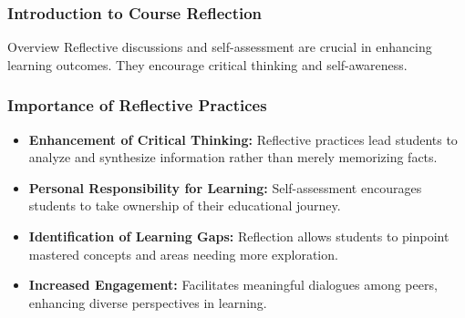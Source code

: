 \documentclass[aspectratio=169]{beamer}
\begin{document}
\frame{\titlepage}

\begin{frame}[fragile]
    \frametitle{Introduction to Course Reflection}
    \begin{block}{Overview}
        Reflective discussions and self-assessment are crucial in enhancing learning outcomes. They encourage critical thinking and self-awareness.
    \end{block}
\end{frame}

\begin{frame}[fragile]
    \frametitle{Importance of Reflective Practices}
    \begin{itemize}
        \item \textbf{Enhancement of Critical Thinking:}
            Reflective practices lead students to analyze and synthesize information rather than merely memorizing facts.
        
        \item \textbf{Personal Responsibility for Learning:}
            Self-assessment encourages students to take ownership of their educational journey.
        
        \item \textbf{Identification of Learning Gaps:}
            Reflection allows students to pinpoint mastered concepts and areas needing more exploration.
        
        \item \textbf{Increased Engagement:}
            Facilitates meaningful dialogues among peers, enhancing diverse perspectives in learning.
    \end{itemize}
\end{frame}
\end{document}
